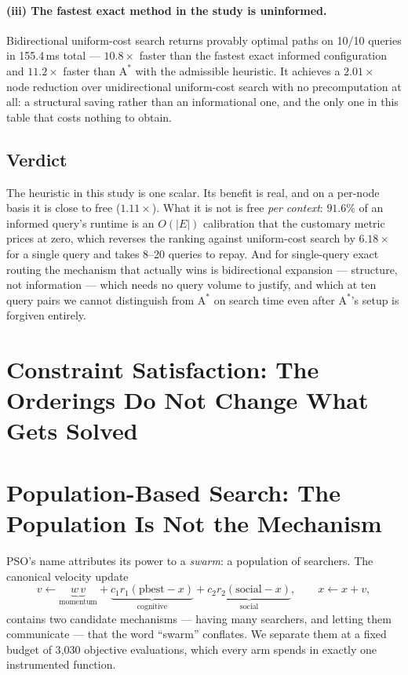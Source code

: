\documentclass[11pt]{article}
\begin{document}
\paragraph{(iii) The fastest exact method in the study is uninformed.} Bidirectional uniform-cost
search returns provably optimal paths on 10/10 queries in 155.4\,ms total --- $10.8\times$ faster
than the fastest exact informed configuration and $11.2\times$ faster than $\mathrm{A}^*$ with the
admissible heuristic. It achieves a $2.01\times$ node reduction over unidirectional uniform-cost
search with no precomputation at all: a structural saving rather than an informational one, and the
only one in this table that costs nothing to obtain.

\subsection{Verdict}

The heuristic in this study is one scalar. Its benefit is real, and on a per-node basis it is
close to free ($1.11\times$). What it is not is free \emph{per context}: $91.6\%$ of an informed
query's runtime is an $O(|E|)$ calibration that the customary metric prices at zero, which
reverses the ranking against uniform-cost search by $6.18\times$ for a single query and takes
8--20 queries to repay. And for single-query exact routing the mechanism that actually wins is
bidirectional expansion --- structure, not information --- which needs no query volume to justify,
and which at ten query pairs we cannot distinguish from $\mathrm{A}^*$ on search time even after
$\mathrm{A}^*$'s setup is forgiven entirely.

\section{Constraint Satisfaction: The Orderings Do Not Change What Gets Solved}
\label{sec:csp}



\section{Population-Based Search: The Population Is Not the Mechanism}
\label{sec:pso}

PSO's name attributes its power to a \emph{swarm}: a population of searchers. The canonical
velocity update
\begin{equation}
v \leftarrow \underbrace{w\,v}_{\text{momentum}}
  + \underbrace{c_1 r_1(\text{pbest}-x)}_{\text{cognitive}}
  + \underbrace{c_2 r_2(\text{social}-x)}_{\text{social}},
  \qquad x \leftarrow x + v,
\label{eq:pso}
\end{equation}
contains two candidate mechanisms --- having many searchers, and letting them communicate --- that
the word ``swarm'' conflates. We separate them at a fixed budget of 3{,}030 objective evaluations,
which every arm spends in exactly one instrumented function.
\end{document}
